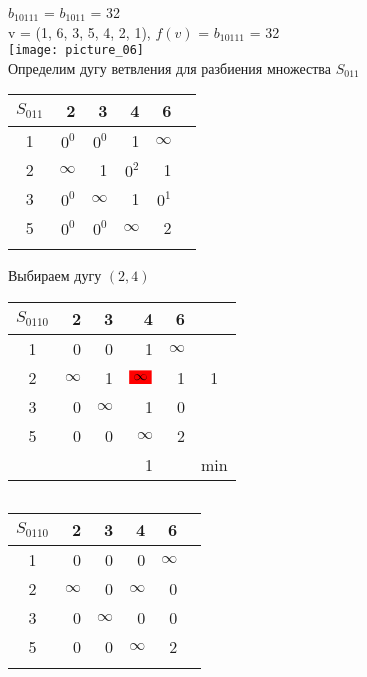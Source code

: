 \documentclass[12pt]{article}
\begin{document}
$b_{10111}$ = $b_{1011}$ = 32\\

v = (1, 6, 3, 5, 4, 2, 1), $f(v)$ = $b_{10111}$  = 32\\
\texttt{[image: picture\_06]}\\ 


Определим дугу ветвления для разбиения множества $S_{011}$\\

\begin{flushleft}
\begin{tabular}{c||rrrr||c}
$S_{011}$  &2 & 3 & 4 & 6 & \\
\hline
\hline
1 &  $0^0$ & $0^0$ & 1  & $\infty$ & \\
2 &  $\infty$ & 1 & $0^2$  & 1 & \\
3 &  $0^0$ & $\infty$ & 1  & $0^1$ & \\
5 &  $0^0$ & $0^0$ & $\infty$  & 2 \\
\hline
\hline
 &  &  &  & \\
\end{tabular}
\end{flushleft}

Выбираем дугу $(2,4)$

\begin{flushleft}
\begin{tabular}{c||rrrr||c}
$S_{0110}$  &2 & 3 & 4 & 6 & \\
\hline
\hline
1 &  0        & 0        & 1                           & $\infty$ & \\
2 &  $\infty$ & 1        & $\colorbox{red}{$\infty$}$  & 1 & 1\\
3 &  0        & $\infty$ & 1                           & 0 & \\
5 &  0        & 0        & $\infty$                    & 2 & \\
\hline
\hline
 &  &  & 1 && min \\
\end{tabular}
$\qquad $ 
\begin{tabular}{c||rrrr||c}
$S_{0110}$  &2 & 3 & 4 & 6 & \\
\hline
\hline
1 &  0        & 0        & 0                           & $\infty$ & \\
2 &  $\infty$ & 0        & $\infty$  & 0 & \\
3 &  0        & $\infty$ & 0                           & 0 & \\
5 &  0        & 0        & $\infty$                    & 2 & \\
\hline
\hline
 &  &  &  & \\
\end{tabular}
\end{flushleft}
\end{document}
